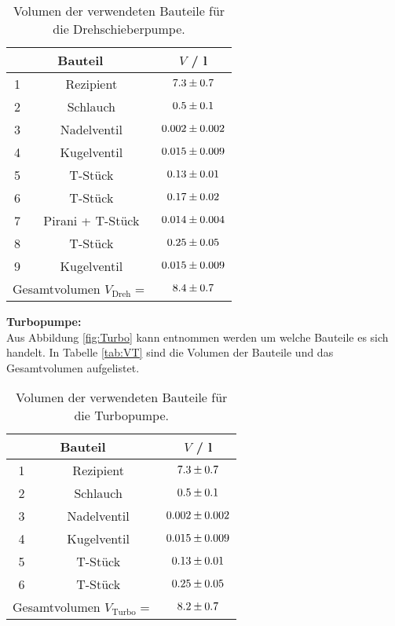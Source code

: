 \begin{table}[H] %
  \centering
  \caption{Volumen der verwendeten Bauteile für die Drehschieberpumpe.}
  \label{tab:VD}
  \begin{tabular}{c|c|c}
    \multicolumn{2}{c|}{Bauteil} & $V$ / l \\
    \midrule
    1 & Rezipient & $\num{7.3 +- 0.7}$ \\
    2 & Schlauch & $\num{0.5 +- 0.1}$ \\
    3 & Nadelventil & $\num{0.002 +- 0.002}$ \\
    4 & Kugelventil & $\num{0.015 +- 0.009}$ \\
    5 & T-Stück & $\num{0.13 +- 0.01}$ \\
    6 & T-Stück & $\num{0.17 +- 0.02}$ \\
    7 & Pirani + T-Stück & $\num{0.014 +- 0.004}$ \\
    8 & T-Stück & $\num{0.25 +- 0.05}$ \\
    9 & Kugelventil & $\num{0.015 +- 0.009}$ \\
    \midrule
    \multicolumn{2}{c}{Gesamtvolumen $V_\text{Dreh} =$} & $\num{8.4 +- 0.7}$ \\
  \end{tabular}
\end{table}

\textbf{Turbopumpe:} \\
Aus Abbildung \eqref{fig:Turbo} kann entnommen werden um welche Bauteile es sich handelt. In Tabelle \eqref{tab:VT} sind die Volumen der Bauteile und das Gesamtvolumen aufgelistet.

\begin{table}[H] %
  \centering
  \caption{Volumen der verwendeten Bauteile für die Turbopumpe.}
  \label{tab:VT}
  \begin{tabular}{c|c|c}
    \multicolumn{2}{c|}{Bauteil} & $V$ / l \\
    \midrule
    1 & Rezipient & $\num{7.3 +- 0.7}$ \\
    2 & Schlauch & $\num{0.5 +- 0.1}$ \\
    3 & Nadelventil & $\num{0.002 +- 0.002}$ \\
    4 & Kugelventil & $\num{0.015 +- 0.009}$ \\
    5 & T-Stück & $\num{0.13 +- 0.01}$ \\
    6 & T-Stück & $\num{0.25 +- 0.05}$ \\
    \midrule
    \multicolumn{2}{c}{Gesamtvolumen $V_\text{Turbo} =$} & $\num{8.2 +- 0.7}$ \\
  \end{tabular}
\end{table}



